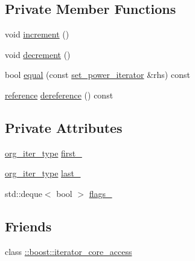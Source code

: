 \subsection*{\-Private \-Member \-Functions}
\begin{DoxyCompactItemize}
\item 
void \hyperlink{classyuh_1_1range__detail_1_1set__power__iterator_aeb2624c7a86b765725fd80cd426e147d}{increment} ()
\item 
void \hyperlink{classyuh_1_1range__detail_1_1set__power__iterator_af998f1201f6ff5160003144e5818b8ba}{decrement} ()
\item 
bool \hyperlink{classyuh_1_1range__detail_1_1set__power__iterator_af305d02e5f0f255a93af284ab45a9960}{equal} (const \hyperlink{classyuh_1_1range__detail_1_1set__power__iterator}{set\-\_\-power\-\_\-iterator} \&rhs) const 
\item 
\hyperlink{classyuh_1_1range__detail_1_1set__power__iterator_aa5d67140d1557795cc6c30a2849d4e05}{reference} \hyperlink{classyuh_1_1range__detail_1_1set__power__iterator_a1b739c629ff6d9f19e13216adc65a999}{dereference} () const 
\end{DoxyCompactItemize}
\subsection*{\-Private \-Attributes}
\begin{DoxyCompactItemize}
\item 
\hyperlink{classyuh_1_1range__detail_1_1set__power__iterator_a7d85ad9a5f85d7a869dd7ea9557eee8b}{org\-\_\-iter\-\_\-type} \hyperlink{classyuh_1_1range__detail_1_1set__power__iterator_a9296ec46eb2f6c43cf6c5263aaf54cca}{first\-\_\-}
\item 
\hyperlink{classyuh_1_1range__detail_1_1set__power__iterator_a7d85ad9a5f85d7a869dd7ea9557eee8b}{org\-\_\-iter\-\_\-type} \hyperlink{classyuh_1_1range__detail_1_1set__power__iterator_a9d115442fe366e570c20b178cc577690}{last\-\_\-}
\item 
std\-::deque$<$ bool $>$ \hyperlink{classyuh_1_1range__detail_1_1set__power__iterator_a54539438ea4c794db488afe8afa24452}{flags\-\_\-}
\end{DoxyCompactItemize}
\subsection*{\-Friends}
\begin{DoxyCompactItemize}
\item 
class \hyperlink{classyuh_1_1range__detail_1_1set__power__iterator_a986bf0deaa7559f361d03122eeea4c86}{\-::boost\-::iterator\-\_\-core\-\_\-access}
\end{DoxyCompactItemize}


